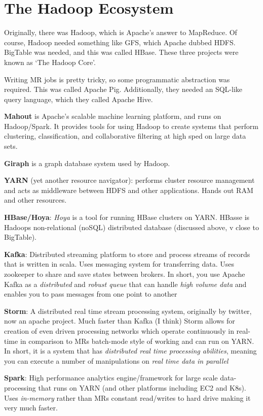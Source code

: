 \documentclass[11pt,a4paper,titlepage,dvipsnames,cmyk]{scrartcl}
\begin{document}
\section{The Hadoop Ecosystem}
Originally, there was Hadoop, which is Apache's answer to MapReduce. Of course, Hadoop needed something like GFS, which Apache dubbed HDFS.
BigTable was needed, and this was called HBase. These three projects were known as `The Hadoop Core'.

Writing MR jobs is pretty tricky, so some programmatic abstraction was required. This was called Apache Pig. Additionally, they needed an SQL-like query language, which they called Apache Hive.

\textbf{Mahout} is Apache's scalable machine learning platform, and runs on Hadoop/Spark. It provides tools for using Hadoop to create systems that perform clustering, classification, and collaborative filtering at high sped on large data sets.

\textbf{Giraph} is a graph database system used by Hadoop.

\textbf{YARN} (yet another resource navigator): performs cluster resource management and acts as middleware between HDFS and other applications. Hands out RAM and other resources.

\textbf{HBase/Hoya}: \textit{Hoya} is a tool for running HBase clusters on YARN. HBasse is Hadoops non-relational (noSQL) distributed database (discussed above, v close to BigTable).

\textbf{Kafka}: Distributed streaming platform to store and process streams of records that is written in scala. Uses messaging system for transferring data. Uses zookeeper to share and save states between brokers. In short, you use Apache Kafka as a \textit{distributed} and \textit{robust queue} that can handle \textit{high volume data} and enables you to pass messages from one point to another

\textbf{Storm}: A distributed real time stream processing system, originally by twitter, now an apache project. Much faster than Kafka (I think) Storm allows for creation of even driven processing networks which operate continuously in real-time in comparison to MRs batch-mode style of working and can run on YARN. In short, it is a system that has \textit{distributed real time processing abilities}, meaning you can execute a number of manipulations on \textit{real time data in parallel}

\textbf{Spark}: High performance analytics engine/framework for large scale data-processing that runs on YARN (and other platforms including EC2 and K8s). Uses \textit{in-memory} rather than MRs constant read/writes to hard drive making it very much faster.
\end{document}
